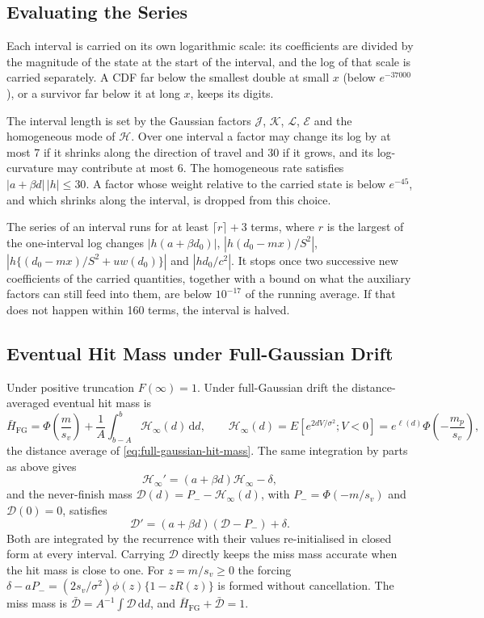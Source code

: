 \documentclass[12pt]{article}
\newcommand{\dd}{\,\mathrm{d}}
\newcommand{\PhiN}{\Phi}
\newcommand{\phiN}{\phi}
\begin{document}
\subsection{Evaluating the Series}
Each interval is carried on its own logarithmic scale: its coefficients are divided by the magnitude of the state at the start of the interval, and the log of that scale is carried separately. A CDF far below the smallest double at small $x$ (below $e^{-37000}$), or a survivor far below it at long $x$, keeps its digits.

The interval length is set by the Gaussian factors $\mathcal J$, $\mathcal K$, $\mathcal L$, $\mathcal E$ and the homogeneous mode of $\mathcal H$. Over one interval a factor may change its log by at most 7 if it shrinks along the direction of travel and 30 if it grows, and its log-curvature may contribute at most 6. The homogeneous rate satisfies $|a+\beta d|\,|h|\le30$. A factor whose weight relative to the carried state is below $e^{-45}$, and which shrinks along the interval, is dropped from this choice.

The series of an interval runs for at least $\lceil r\rceil+3$ terms, where $r$ is the largest of the one-interval log changes $|h(a+\beta d_0)|$, $|h(d_0-mx)/S^2|$, $|h\{(d_0-mx)/S^2+uw(d_0)\}|$ and $|hd_0/c^2|$. It stops once two successive new coefficients of the carried quantities, together with a bound on what the auxiliary factors can still feed into them, are below $10^{-17}$ of the running average. If that does not happen within 160 terms, the interval is halved.

\subsection{Eventual Hit Mass under Full-Gaussian Drift}
Under positive truncation $F(\infty)=1$. Under full-Gaussian drift the distance-averaged eventual hit mass is
\begin{equation}
 \bar H_{\mathrm{FG}}=\PhiN\!\left(\frac{m}{s_v}\right)
 +\frac{1}{A}\int_{b-A}^b\mathcal H_\infty(d)\dd d,
 \qquad
 \mathcal H_\infty(d)=E\left[e^{2dV/\sigma^2};V<0\right]
 =e^{\ell(d)}\PhiN\!\left(-\frac{m_p}{s_v}\right),
\end{equation}
the distance average of \eqref{eq:full-gaussian-hit-mass}. The same integration by parts as above gives
\begin{equation}
 \mathcal H_\infty'=(a+\beta d)\mathcal H_\infty-\delta,
\end{equation}
and the never-finish mass $\mathcal D(d)=P_--\mathcal H_\infty(d)$, with $P_-=\PhiN(-m/s_v)$ and $\mathcal D(0)=0$, satisfies
\begin{equation}
 \mathcal D'=(a+\beta d)(\mathcal D-P_-)+\delta.
\end{equation}
Both are integrated by the recurrence with their values re-initialised in closed form at every interval. Carrying $\mathcal D$ directly keeps the miss mass accurate when the hit mass is close to one. For $z=m/s_v\ge0$ the forcing $\delta-aP_-=(2s_v/\sigma^2)\phiN(z)\{1-zR(z)\}$ is formed without cancellation. The miss mass is $\bar{\mathcal D}=A^{-1}\int\mathcal D\dd d$, and $\bar H_{\mathrm{FG}}+\bar{\mathcal D}=1$.
\end{document}
